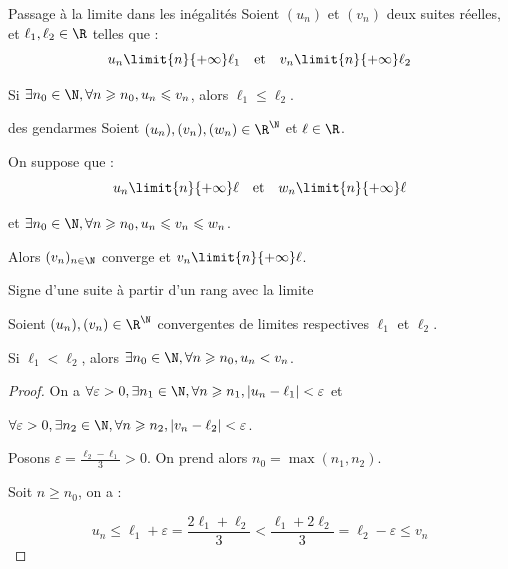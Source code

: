 \begin{theoreme}{Passage à la limite dans les inégalités}{}
    Soient $(u_n)$ et $(v_n)$ deux suites réelles, et $\ell_1, \ell_2 \in \R$ telles que :
    \[ u_n \limit{n}{+\infty} \ell_1 \quad \text{et} \quad v_n \limit{n}{+\infty} \ell_2 \]

    Si $\exists n_0 \in \N, \forall n \geqslant n_0, u_n \leqslant v_n$, alors $\ell_1 \leqslant \ell_2$.
\end{theoreme}

\begin{theoreme}{des gendarmes}{}
    Soient $(u_n), (v_n), (w_n) \in \R^{\N}$ et $\ell \in \R$. 
    
    On suppose que : 
    \[u_n \limit{n}{+\infty} \ell \quad \text{et} \quad w_n \limit{n}{+\infty} \ell\]

    et $\exists n_0 \in \N, \forall n \geqslant n_0, u_n \leqslant v_n \leqslant w_n$. 

    Alors $(v_n)_{n \in \N}$ converge et $v_n \limit{n}{+\infty} \ell$.
    
\end{theoreme}

\begin{theoreme}{Signe d'une suite à partir d'un rang avec la limite}{}

    Soient $(u_n), (v_n) \in \R^{\N}$ convergentes de limites
    respectives $\ell_1$ et $\ell_2$.

    Si $\ell_1 < \ell_2$, alors $\exists n_0 \in \N, \forall n \geqslant n_0, u_n < v_n$.
\end{theoreme}


\begin{proof}
    On a $\forall \varepsilon > 0, \exists n_1 \in \N, \forall n \geqslant n_1, |u_n - \ell_1| < \varepsilon$ et

    $\forall \varepsilon > 0, \exists n_2 \in \N, \forall n \geqslant n_2, |v_n - \ell_2| < \varepsilon$.

    Posons $\displaystyle \varepsilon = \frac{\ell_2 - \ell_1} 3 > 0$. On prend alors 
    $n_0 = \max(n_1, n_2)$.

    Soit $n \geqslant n_0$, on a :

    \[u_n \leqslant \ell_1 + \varepsilon = \frac{2\ell_1 + \ell_2} 3 < \frac{\ell_1 + 2\ell_2}{3} = \ell_2 - \varepsilon \leqslant v_n\]
\end{proof}

